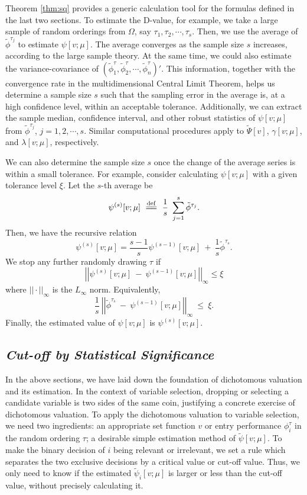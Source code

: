 \documentclass[a4paper,12pt]{article}
\newcommand{\eqdef}{\overset{\mathrm{def}}{=\joinrel=}}
\begin{document}
Theorem \ref{thm:sq} provides a generic calculation tool for the formulas defined in the last two sections.
To estimate the D-value, for example, we take a large sample of random orderings from $\Omega$, say $\tau_1,\tau_2, \cdots, \tau_s$. 
Then, we use the average of $\tilde \phi^{\tau_j}$ to estimate $\psi[v;\mu]$.
The average converges as the sample size $s$ increases, according to the large sample theory.
At the same time, we could also estimate the variance-covariance of  $\left (\tilde \phi^\tau_1, \tilde \phi^\tau_2,\cdots, \tilde \phi^\tau_n \right )'$.
This information, together with the convergence rate in the multidimensional Central Limit Theorem, helps us determine a sample size $s$ such
that the sampling error in the average is, at a high confidence level, within an acceptable tolerance.
Additionally, we can extract the sample median, confidence interval, and other robust statistics 
of $\psi[v;\mu]$ from $\tilde \phi^{\tau_j}$, $j=1,2, \cdots, s$.
Similar computational procedures apply to $\tilde \Psi[v]$, $\gamma[v;\mu]$, and $\lambda[v;\mu]$, respectively.

We can also determine the sample size $s$ once the change of the average series is within a small tolerance. For example, consider calculating $\psi[v;\mu]$ with a given tolerance level $\xi$.
Let the $s$-th average be
$$
\psi^{(s)}[v;\mu] \
\eqdef \
\frac{1}{s} \ \sum\limits_{j=1}^s \tilde \phi^{\tau_j}.
$$
Then, we have the recursive relation
$$
\psi^{(s)}[v;\mu]
=
\frac{s-1}{s} \psi^{(s-1)} [v;\mu] \
+ \
\frac{1}{s} \tilde \phi^{\tau_s}.
$$
We stop any further randomly drawing $\tau$ if
$$
\left | \left | \psi^{(s)}[v;\mu] \
 - \
 \psi^{(s-1)}[v;\mu] \right | \right |_\infty \le \xi
$$
where $||\cdot||_\infty$ is the $L_\infty$ norm. Equivalently,
$$
\frac{1}{s} \ \left | \left | \tilde\phi^{\tau_s}  \ - \ \psi^{(s-1)}[v;\mu] \right | \right |_\infty \ \le \  \xi.
$$
Finally, the estimated value of  $\psi[v;\mu]$ is $\psi^{(s)}[v;\mu]$.



\subsection{\textit{Cut-off by Statistical Significance}}\label{subsect:cutoff_sig}

\noindent 
In the above sections, we have laid down the foundation of dichotomous valuation and its estimation. 
In the context of variable selection, dropping or selecting a candidate variable is two sides of the same coin, justifying a concrete exercise of dichotomous valuation.
To apply the dichotomous valuation to variable selection, we need two ingredients: an appropriate set function $v$ or entry performance $\phi^\tau_i$ in the random ordering $\tau$;
a desirable simple estimation method of $\tilde \psi[v;\mu]$.
To make the binary decision of $i$ being relevant or irrelevant, we set a rule which separates the two exclusive decisions by a critical value or cut-off value.
Thus, we only need to know if the estimated $\tilde \psi_i[v;\mu]$ is larger or less than the cut-off value, without precisely calculating it.
\end{document}
